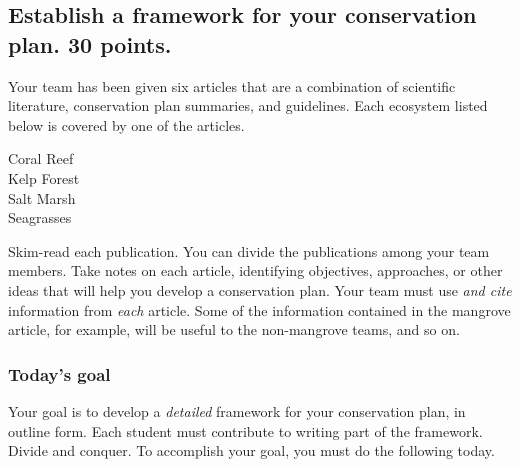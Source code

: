 \documentclass[12pt, hidelinks]{exam}
\begin{document}
\subsection*{Establish a framework for your conservation plan. 30 points.}

Your team has been given six articles that are a combination of scientific literature, conservation plan summaries, and guidelines.  Each ecosystem listed below is covered by one of the articles.

\begin{multicols}{3}

Coral Reef\\ 
Kelp Forest\\ 
Salt Marsh\\
Seagrasses

\end{multicols}

Skim-read each publication. You can divide the publications among your team members. Take notes on each article, identifying objectives, approaches, or other ideas that will help you develop a conservation plan. Your team must use \emph{and cite} information from \emph{each} article. Some of the information contained in the mangrove article, for example, will be useful to the non-mangrove teams, and so on. 

\subsubsection*{Today's goal}

Your goal is to develop a \emph{detailed} framework for your conservation plan, in outline form. Each student must contribute to writing part of the framework. Divide and conquer. To accomplish your goal, you must do the following today.
\end{document}
